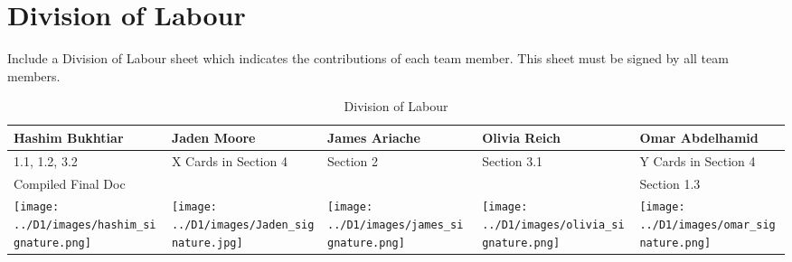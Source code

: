 \documentclass[]{article}
\begin{document}

\clearpage
\appendix
\section{Division of Labour}
\label{sec:division_of_labour}
Include a Division of Labour sheet which indicates the contributions of each team member. This sheet must be signed by all team members.
\begin{table}[h!]
\centering
\begin{tabular}{|p{3cm}|p{3.5cm}|p{3cm}|p{3cm}|p{3.5cm}|}
\hline
Hashim Bukhtiar & Jaden Moore & James Ariache & Olivia Reich & Omar Abdelhamid \\ \hline
1.1, 1.2, 3.2 & X Cards in Section 4 & Section 2 & Section 3.1 & Y Cards in Section 4 \\ 
Compiled Final Doc &  &  &  & Section 1.3 \\
\texttt{[image: ../D1/images/hashim\_signature.png]} & \texttt{[image: ../D1/images/Jaden\_signature.jpg]} &
\texttt{[image: ../D1/images/james\_signature.png]}& \texttt{[image: ../D1/images/olivia\_signature.png]} & \texttt{[image: ../D1/images/omar\_signature.png]}  \\
\hline
\end{tabular}
\caption{Division of Labour} 
\label{tab:division_of_labour}
\end{table}
\end{document}
